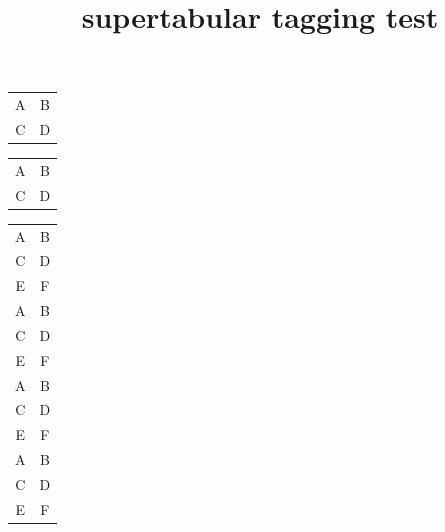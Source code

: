 \documentclass{article}
\title{supertabular tagging test}
\begin{document}
\begin{supertabular}{cc}
A & B \\
C & D \\
\end{supertabular}

\begin{center}
\begin{supertabular}{cc}
A & B \\
C & D \\
\end{supertabular}
\end{center}

\vspace{5in}

\begin{supertabular}{cc}
A & B \\
C & D \\
E & F \\
A & B \\
C & D \\
E & F \\
A & B \\
C & D \\
E & F \\
A & B \\
C & D \\
E & F \\
\end{supertabular}
\end{document}
